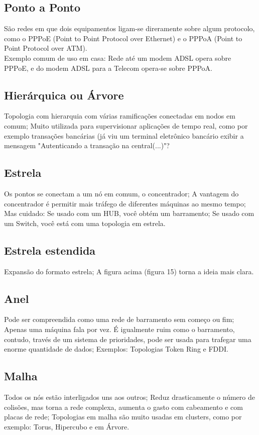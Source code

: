 \documentclass{article}
\begin{document}
\subsection{Ponto a Ponto}
São redes em que dois equipamentos ligam-se direramente sobre algum protocolo, como
o PPPoE (Point to Point Protocol over Ethernet) e o PPPoA (Point to Point
Protocol over ATM).\\
Exemplo comum de uso em casa: Rede até um modem ADSL opera sobre PPPoE, e do
modem ADSL para a Telecom opera-se sobre PPPoA.

\subsection{Hierárquica ou Árvore}
Topologia com hierarquia com várias ramificações conectadas em nodos em comum;
Muito utilizada para supervisionar aplicações de tempo real, como por exemplo
transações bancárias (já viu um terminal eletrônico bancário exibir a mensagem "Autenticando a transação na central(...)"?

\subsection{Estrela}
Os pontos se conectam a um nó em comum, o concentrador; A vantagem do
concentrador é permitir mais tráfego de diferentes máquinas ao mesmo tempo; Mas
cuidado: Se usado com um HUB, você obtém um barramento; Se usado com um Switch,
você está com uma topologia em estrela.

\subsection{Estrela estendida}
Expansão do formato estrela; A figura acima (figura 15) torna a ideia mais clara.

\subsection{Anel}
Pode ser compreendida como uma rede de barramento sem começo ou fim; Apenas uma
máquina fala por vez. É igualmente ruim como o barramento, contudo, través de um
sistema de prioridades, pode ser usada para trafegar uma enorme quantidade de
dados; Exemplos: Topologias Token Ring e FDDI.

\subsection{Malha}
Todos os nós estão interligados uns aos outros; Reduz drasticamente o número de
colisões, mas torna a rede complexa, aumenta o gasto com cabeamento e com placas de
rede; Topologias em malha são muito usadas em clusters, como por exemplo: Torus,
Hipercubo e em Árvore.
\end{document}
